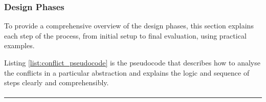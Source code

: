 \subsubsection*{Design Phases}\label{conflict_design_phases}
To provide a comprehensive overview of the design phases, this section explains each step of the process, from initial setup to final evaluation, using practical examples.

Listing \ref{list:conflict_pseudocode} is the pseudocode that describes how to analyse the conflicts in a particular abstraction and explains the logic and sequence of steps clearly and comprehensibly.
\begin{MyListing}
	
		
	
	\paragraph{}
	
	\hrule
	
	\begin{flushleft}
	 

\end{flushleft}
\end{MyListing}
